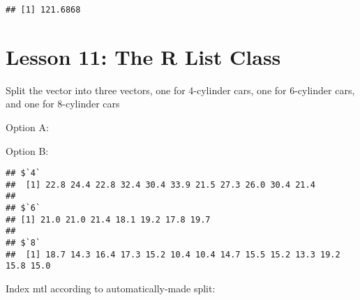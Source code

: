 \documentclass[
]{article}
\newenvironment{Shaded}{\begin{snugshade}}{\end{snugshade}}
\newcommand{\DecValTok}[1]{\textcolor[rgb]{0.00,0.00,0.81}{#1}}
\newcommand{\FunctionTok}[1]{\textcolor[rgb]{0.00,0.00,0.00}{#1}}
\newcommand{\NormalTok}[1]{#1}
\newcommand{\OtherTok}[1]{\textcolor[rgb]{0.56,0.35,0.01}{#1}}
\newcommand{\SpecialCharTok}[1]{\textcolor[rgb]{0.00,0.00,0.00}{#1}}
\begin{document}
\begin{verbatim}
## [1] 121.6868
\end{verbatim}

\hypertarget{lesson-11-the-r-list-class}{%
\section{Lesson 11: The R List Class}\label{lesson-11-the-r-list-class}}

\begin{Shaded}
\end{Shaded}

Split the vector into three vectors, one for 4-cylinder cars, one for
6-cylinder cars, and one for 8-cylinder cars

Option A:

\begin{Shaded}
\end{Shaded}

Option B:

\begin{Shaded}
\end{Shaded}

\begin{verbatim}
## $`4`
##  [1] 22.8 24.4 22.8 32.4 30.4 33.9 21.5 27.3 26.0 30.4 21.4
## 
## $`6`
## [1] 21.0 21.0 21.4 18.1 19.2 17.8 19.7
## 
## $`8`
##  [1] 18.7 14.3 16.4 17.3 15.2 10.4 10.4 14.7 15.5 15.2 13.3 19.2 15.8 15.0
\end{verbatim}

Index mtl according to automatically-made split:
\end{document}
